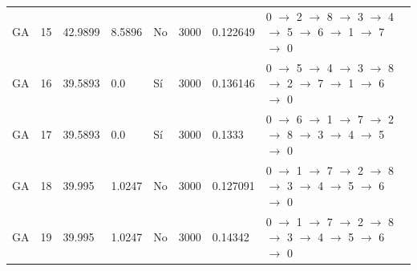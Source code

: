 \begin{table}[htbp]
\begin{tabular}{llllllll}
    GA & 15 & 42.9899 & 8.5896 & No & 3000 & 0.122649 & 0 $\rightarrow$ 2 $\rightarrow$ 8 $\rightarrow$ 3 $\rightarrow$ 4 $\rightarrow$ 5 $\rightarrow$ 6 $\rightarrow$ 1 $\rightarrow$ 7 $\rightarrow$ 0 \\
    GA & 16 & 39.5893 & 0.0 & Sí & 3000 & 0.136146 & 0 $\rightarrow$ 5 $\rightarrow$ 4 $\rightarrow$ 3 $\rightarrow$ 8 $\rightarrow$ 2 $\rightarrow$ 7 $\rightarrow$ 1 $\rightarrow$ 6 $\rightarrow$ 0 \\
    GA & 17 & 39.5893 & 0.0 & Sí & 3000 & 0.1333 & 0 $\rightarrow$ 6 $\rightarrow$ 1 $\rightarrow$ 7 $\rightarrow$ 2 $\rightarrow$ 8 $\rightarrow$ 3 $\rightarrow$ 4 $\rightarrow$ 5 $\rightarrow$ 0 \\
    GA & 18 & 39.995 & 1.0247 & No & 3000 & 0.127091 & 0 $\rightarrow$ 1 $\rightarrow$ 7 $\rightarrow$ 2 $\rightarrow$ 8 $\rightarrow$ 3 $\rightarrow$ 4 $\rightarrow$ 5 $\rightarrow$ 6 $\rightarrow$ 0 \\
    GA & 19 & 39.995 & 1.0247 & No & 3000 & 0.14342 & 0 $\rightarrow$ 1 $\rightarrow$ 7 $\rightarrow$ 2 $\rightarrow$ 8 $\rightarrow$ 3 $\rightarrow$ 4 $\rightarrow$ 5 $\rightarrow$ 6 $\rightarrow$ 0 \\
    \bottomrule
  \end{tabular}
\end{table}
